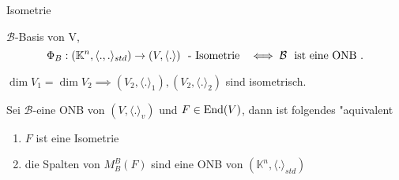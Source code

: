 \documentclass[class=article, crop=false]{standalone}
\begin{document}
\begin{zettel}{Isometrie}
\begin{remark}
\end{remark}

\begin{corollary}
    $\mathcal{B}$-Basis von V, 
\[
    \Phi_B : (\mathbb{K}^n, \langle.,.\rangle_{std})  \to (V, \langle .\rangle) \tx{ - Isometrie }  \iff \mathcal{B} \tx{ ist eine ONB} 
.\]
\end{corollary}

\begin{corollary}
$\dim V_1 = \dim V_2 \implies  (V_2, \langle .\rangle_1), (V_2, \langle .\rangle_2)$  sind isometrisch.
\end{corollary}

\begin{theorem}[7.5]
    Sei $\mathcal{B}$-eine ONB von $(V, \langle .\rangle_v)$ und $F \in  \operatorname{End}(V)$, dann ist folgendes "aquivalent
    \begin{enumerate}
        \item $F$ ist eine Isometrie
        \item die Spalten von $M_B^B (F) $ sind eine ONB von $( \mathbb{K}^n, \langle .\rangle_{std})$ 
    \end{enumerate}
\end{theorem}
\end{zettel}
\end{document}
